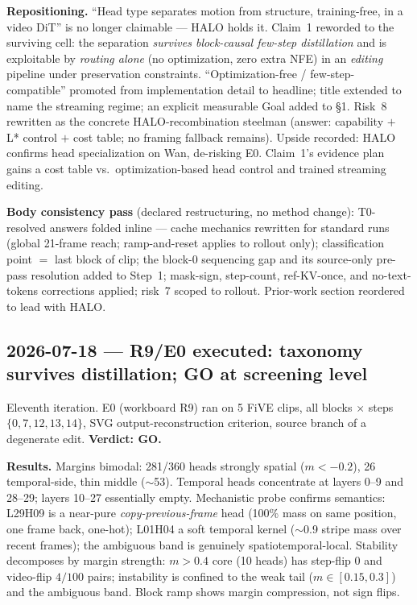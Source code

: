 \documentclass{article}
\begin{document}
\textbf{Repositioning.} ``Head type separates motion from structure,
training-free, in a video DiT'' is no longer claimable --- HALO holds it.
Claim~1 reworded to the surviving cell: the separation \emph{survives
block-causal few-step distillation} and is exploitable by \emph{routing alone}
(no optimization, zero extra NFE) in an \emph{editing} pipeline under
preservation constraints. ``Optimization-free / few-step-compatible'' promoted
from implementation detail to headline; title extended to name the streaming
regime; an explicit measurable Goal added to \S1. Risk~8 rewritten as the
concrete HALO-recombination steelman (answer: capability $+$ L* control $+$
cost table; no framing fallback remains). Upside recorded: HALO confirms head
specialization on Wan, de-risking E0. Claim~1's evidence plan gains a cost
table vs.\ optimization-based head control and trained streaming editing.

\textbf{Body consistency pass} (declared restructuring, no method change):
T0-resolved answers folded inline --- cache mechanics rewritten for standard
runs (global 21-frame reach; ramp-and-reset applies to rollout only);
classification point $=$ last block of clip; the block-0 sequencing gap and its
source-only pre-pass resolution added to Step~1; mask-sign, step-count,
ref-KV-once, and no-text-tokens corrections applied; risk~7 scoped to rollout.
Prior-work section reordered to lead with HALO.

\subsection*{2026-07-18 --- R9/E0 executed: taxonomy survives distillation; GO at screening level}

Eleventh iteration. E0 (workboard R9) ran on 5 FiVE clips, all blocks $\times$
steps $\{0,7,12,13,14\}$, SVG output-reconstruction criterion, source branch of
a degenerate edit. \textbf{Verdict: GO.}

\textbf{Results.} Margins bimodal: 281/360 heads strongly spatial
($m < -0.2$), 26 temporal-side, thin middle ($\sim$53). Temporal heads
concentrate at layers 0--9 and 28--29; layers 10--27 essentially empty.
Mechanistic probe confirms semantics: L29H09 is a near-pure
\emph{copy-previous-frame} head (100\% mass on same position, one frame back,
one-hot); L01H04 a soft temporal kernel ($\sim$0.9 stripe mass over recent
frames); the ambiguous band is genuinely spatiotemporal-local. Stability
decomposes by margin strength: $m > 0.4$ core (10 heads) has step-flip 0 and
video-flip $4/100$ pairs; instability is confined to the weak tail
($m \in [0.15, 0.3]$) and the ambiguous band. Block ramp shows margin
compression, not sign flips.
\end{document}
